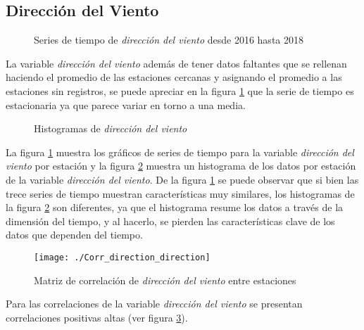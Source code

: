 \subsection{Dirección del Viento}
\begin{figure}[H]
\centering
{}
\caption{Series de tiempo de {\em dirección del viento} desde 2016 hasta 2018}
\label{seriedirection}
\end{figure}

La variable {\em dirección del viento} además de tener datos faltantes que se rellenan haciendo el promedio de las estaciones cercanas y asignando el promedio a las estaciones sin registros, se puede apreciar en la figura \ref{seriedirection} que la serie de tiempo es estacionaria ya que parece variar en torno a una media.

\begin{figure}[H]
\centering
{}
\caption{Histogramas de {\em dirección del viento}}
\label{histdirection}
\end{figure}

La figura \ref{seriedirection} muestra los gráficos de series de tiempo para la variable {\em dirección del viento} por estación y la figura \ref{histdirection} muestra un histograma de los datos por estación de la variable {\em dirección del viento}. De la figura \ref{seriedirection} se puede observar que si bien las trece series de tiempo muestran características muy similares, los histogramas de la figura \ref{histdirection} son diferentes, ya que el histograma resume los datos a través de la dimensión del tiempo, y al hacerlo, se pierden las características clave de los datos que dependen del tiempo.

\begin{figure}[H]
\centering
\texttt{[image: ./Corr\_direction\_direction]}
\caption{Matriz de correlación de {\em dirección del viento} entre estaciones }
\label{corrdirection}
\end{figure}

Para las correlaciones de la variable {\em dirección del viento} se presentan correlaciones positivas altas (ver figura \ref{corrdirection}).


